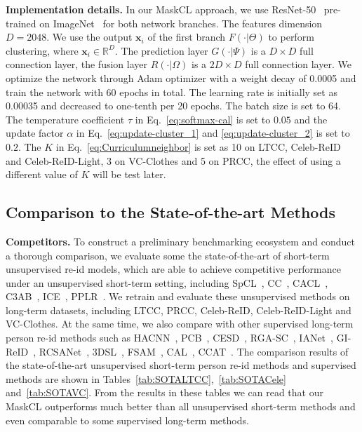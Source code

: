 \documentclass[10pt,twocolumn,letterpaper]{article}
\newcommand{\reid}{re-id}
\newcommand{\sota}{the state-of-the-art}
\newcommand{\myparagraph}[1]{\noindent\textbf{#1.}}
\def\x{\boldsymbol{x}}
\def\RR{\mathbb{R}}
\begin{document}
\myparagraph{Implementation details} In our MaskCL approach, we use ResNet-50~\cite{he:CVPR16resnet} pre-trained on ImageNet~\cite{Krizhevsky:NIPS12} for both  network branches.
The features dimension $D = 2048$.
We use the output $\x_i$ of the first branch $F(\cdot|\Theta)$ to perform clustering, where $\x_i \in  \RR^D$. 
The prediction layer $G(\cdot|\Psi)$ is a $D \times D$ full connection layer, the fusion layer $R(\cdot|\Omega)$ is a $2D \times D$ full connection layer. 
We optimize the network through Adam optimizer \cite{Kingma:arXiv2014} with a weight decay of 0.0005 and train the network with 60 epochs in total. The learning rate is initially set as 0.00035 and decreased to one-tenth per 20 epochs. 
The batch size is set to 64. 
The temperature coefficient $\tau$ in Eq.~\eqref{eq:softmax-cal} is set to $0.05$ and the update factor $\alpha$ in Eq.~\eqref{eq:update-cluster_1} and \eqref{eq:update-cluster_2} is set to $0.2$. The $K$ in Eq.~\eqref{eq:Curriculumneighbor} is set as 10 on LTCC, Celeb-ReID
and Celeb-ReID-Light, 3 on VC-Clothes and 5 on PRCC, the effect of using a different value of $K$ will be test later. 




\subsection{Comparison to the State-of-the-art Methods} 
\label{subsec:comp-to-sota}

\myparagraph{Competitors}
\label{p:baselines}
To construct a preliminary benchmarking ecosystem and conduct a thorough comparison, we evaluate some \sota{} of short-term unsupervised \reid{} models, which are able to achieve competitive performance under an unsupervised short-term setting, including SpCL~\cite{Ge:NIPS20}, CC~\cite{tanping:arxiv2020}, CACL~\cite{TIPlmk}, C3AB~\cite{lmkpr}, ICE~\cite{ICE}, PPLR~\cite{PPLR}.
We retrain and evaluate these unsupervised methods on long-term datasets, including LTCC, PRCC, Celeb-ReID, Celeb-ReID-Light and VC-Clothes. 
At the same time, we also compare with other supervised long-term person \reid{} methods such as HACNN~\cite{li:HACNNCVPR18}, PCB~\cite{sun:PCBECCV18}, CESD~\cite{qian:CESDACCV20}, RGA-SC~\cite{zhang:RGASCCVPR20}, IANet~\cite{hou:IANETCVPR19}, GI-ReID~\cite{jin:GI-ReIDCVPR22}, RCSANet~\cite{huang:RCSANetCVPR21}, 3DSL~\cite{chen:3DSLCVPR21}, FSAM~\cite{hong:FSAMCVPR21}, CAL~\cite{CCgu:CVPR22}, CCAT~\cite{ren:CCATIJCNN22}. 
The comparison results of the state-of-the-art unsupervised short-term  person \reid{} methods and supervised methods are shown in Tables~\ref{tab:SOTALTCC},~\ref{tab:SOTACele} and~\ref{tab:SOTAVC}.
From the results in these tables we can read that our MaskCL outperforms much better than all unsupervised short-term methods and even comparable to some supervised long-term methods.
\end{document}
